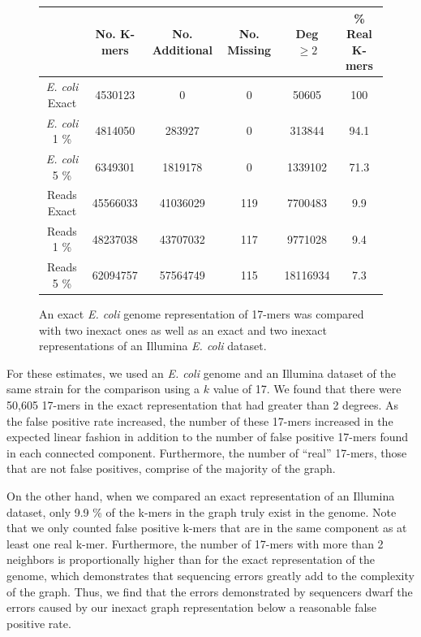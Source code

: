 \documentclass[12pt]{article} \usepackage{simplemargins}
\begin{document}
\begin{figure}
\begin{tabular}{ | c || c | c | c | c | c | }
\hline
 & No. K-mers & No. Additional & No. Missing & Deg $\ge 2$ & \% Real K-mers \\ \hline \hline
\emph{E. coli} Exact & 4530123 & 0 & 0 & 50605 & 100 \\ \hline
\emph{E. coli} 1 \% & 4814050 & 283927 & 0 & 313844 & 94.1 \\ \hline
\emph{E. coli} 5 \% & 6349301 & 1819178 & 0 & 1339102 & 71.3 \\ \hline
Reads Exact & 45566033 & 41036029 & 119 & 7700483 & 9.9 \\ \hline
Reads 1 \% & 48237038 & 43707032 & 117 & 9771028 & 9.4 \\ \hline
Reads 5 \% & 62094757 & 57564749 & 115 & 18116934 & 7.3 \\
\hline
\end{tabular}
\caption{An exact \emph{E. coli} genome representation of 17-mers was compared with 
two inexact ones as well as an exact and two inexact representations of an Illumina 
\emph{E. coli} dataset.}
\end{figure}

For these estimates, we used an \emph{E. coli} genome and an Illumina 
dataset of the same strain for the comparison using a $k$ value of 17. We found 
that there were 50,605 17-mers in the exact representation that had greater than 
2 degrees. As the false positive rate increased, the number of these 
17-mers increased in the expected linear fashion in addition to the number of 
false positive 17-mers found in each connected component. Furthermore, the number of 
``real'' 17-mers, those that are not false positives, 
comprise of the majority of the graph.

On the other hand, when we compared an exact representation of an Illumina dataset, 
only 9.9 \% of the k-mers in the graph truly exist in the genome. Note 
that we only counted false positive k-mers that are in the same component as 
at least one real k-mer. Furthermore, the number of 17-mers with more than 
2 neighbors is proportionally higher than for the exact representation of the 
genome, which demonstrates that sequencing errors greatly add to the complexity 
of the graph. Thus, we find that the errors demonstrated by 
sequencers dwarf the errors caused by our inexact graph representation 
below a reasonable false positive rate.
\end{document}
